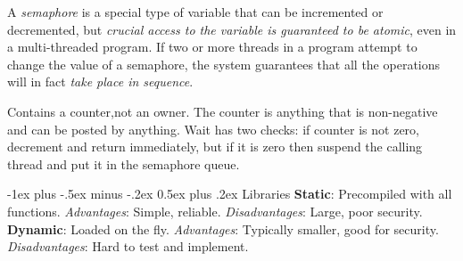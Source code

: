 \documentclass[10pt,landscape, a4paper]{article}
\makeatletter
\renewcommand{\section}{\@startsection{section}{1}{0mm}%
                                {-1ex plus -.5ex minus -.2ex}%
                                {0.5ex plus .2ex}%
                                {\normalfont\large\bfseries}}
\makeatother
\begin{document}
\begin{multicols}{3}
A \emph{semaphore} is a special type of variable that can be incremented or decremented, 
but \emph{crucial access to the variable is guaranteed to be atomic}, even in a multi-threaded program.
If two or more threads in a program attempt to change the value of a semaphore, 
the system guarantees that all the operations will in fact \emph{take place in sequence}.

Contains a counter,not an owner. The counter is anything that is non-negative and can be 
posted by anything. Wait has two checks: if counter is not zero, decrement and return 
immediately, but if it is zero then suspend the calling thread and put it in the 
semaphore queue. 

\section{Libraries}
\textbf{Static}: Precompiled with all functions.
\emph{Advantages}: Simple, reliable.
\emph{Disadvantages}: Large, poor security.
\textbf{Dynamic}: Loaded on the fly.
\emph{Advantages}: Typically smaller, good for security.
\emph{Disadvantages}: Hard to test and implement.

\end{multicols}
\end{document}
